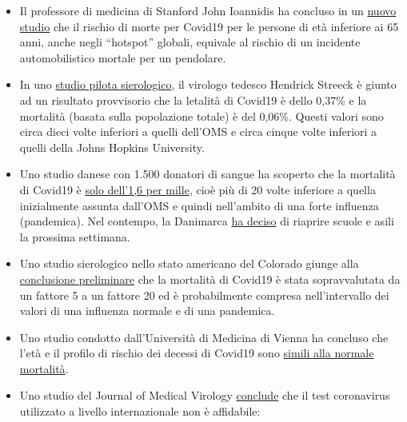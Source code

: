 \begin{itemize}
\tightlist
\item
  Il professore di medicina di Stanford John Ioannidis ha concluso in un
  \href{https://www.medrxiv.org/content/10.1101/2020.04.05.20054361v1}{nuovo
  studio} che il rischio di morte per Covid19 per le persone di età
  inferiore ai 65 anni, anche negli ``hotspot'' globali, equivale al
  rischio di un incidente automobilistico mortale per un pendolare.
\item
  In uno
  \href{https://www.land.nrw/sites/default/files/asset/document/zwischenergebnis_covid19_case_study_gangelt_0.pdf}{studio
  pilota sierologico}, il virologo tedesco Hendrick Streeck è giunto ad
  un risultato provvisorio che la letalità di Covid19 è dello 0,37\% e
  la mortalità (basata sulla popolazione totale) è del 0,06\%. Questi
  valori sono circa dieci volte inferiori a quelli dell'OMS e circa
  cinque volte inferiori a quelli della Johns Hopkins University.
\item
  Uno studio danese con 1.500 donatori di sangue ha scoperto che la
  mortalità di Covid19 è
  \href{https://www.dr.dk/nyheder/indland/doedelighed-skal-formentlig-taelles-i-promiller-danske-blodproever-kaster-nyt-lys}{solo
  dell'1,6 per mille}, cioè più di 20 volte inferiore a quella
  inizialmente assunta dall'OMS e quindi nell'ambito di una forte
  influenza (pandemica). Nel contempo, la Danimarca
  \href{https://www.thelocal.dk/20200406/denmark-to-reopen-schools-and-kindergartens-next-week}{ha
  deciso} di riaprire scuole e asili la prossima settimana.
\item
  Uno studio sierologico nello stato americano del Colorado giunge alla
  \href{https://reason.com/2020/04/08/mass-antibody-testing-in-this-rural-colorado-county-sheds-light-on-covid-19s-prevalence-and-lethality/}{conclusione
  preliminare} che la mortalità di Covid19 è stata sopravvalutata da un
  fattore 5 a un fattore 20 ed è probabilmente compresa nell'intervallo
  dei valori di una influenza normale e di una pandemica.
\item
  Uno studio condotto dall'Università di Medicina di Vienna ha concluso
  che l'età e il profilo di rischio dei decessi di Covid19 sono
  \href{https://www.vienna.at/analyse-zeigt-covid-19-opferkurve-entspricht-normaler-mortalitaet/6581246}{simili
  alla normale mortalità}.
\item
  Uno studio del Journal of Medical Virology
  \href{https://www.ncbi.nlm.nih.gov/pubmed/32219885}{conclude} che il
  test coronavirus utilizzato a livello internazionale non è affidabile:

\end{itemize}
